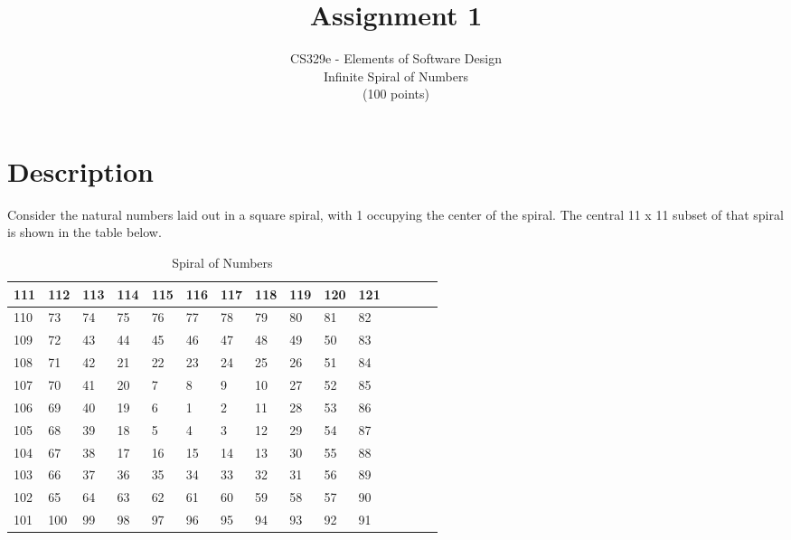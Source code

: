 \documentclass[12pt]{article}
\begin{document}
\title{Assignment 1}%
\author{CS329e - Elements of Software Design \\ %
Infinite Spiral of Numbers \\
(100 points)\\
} %

\date{\vspace{-5ex}}

\maketitle

\begin{center}



\end{center}


\section{Description}
Consider the natural numbers laid out in a square spiral, with 1 occupying the center of the spiral.
The central 11 x 11 subset of that spiral is shown in the table below.


\begin{table}[!h]

    \begin{center}
    \begin{tabular}{|l |l |l |l |l |l |l |l |l |l |l |l |l |l | l|} \hline
    111	& 112	& 113	& 114	& 115	& 116	& 117	& 118	& 119 & 120 & 121 \\ \hline 
    110 & 73 & 74 & 75 & 76 & 77 & 78 & 79 & 80 & 81 & 82 \\ \hline 
    109 & 72 & 43 & 44 & 45 & 46 & 47 & 48 & 49 & 50 & 83 \\ \hline 
    108 & 71 & 42 & 21 & 22 & 23 & 24 & 25 & 26 & 51 & 84 \\ \hline 
    107 & 70 & 41 & 20 & 7 & 8 & 9 & 10 & 27 & 52 & 85 \\ \hline 
    106 & 69 & 40 & 19 & 6 & 1 & 2 & 11 & 28 & 53 & 86 \\ \hline 
    105 & 68 & 39 & 18 & 5 & 4 & 3 & 12 & 29 & 54 & 87 \\ \hline 
    104 & 67 & 38 & 17 & 16 & 15 & 14 & 13 & 30 & 55 & 88 \\ \hline 
    103 & 66 & 37 & 36 & 35 & 34 & 33 & 32 & 31 & 56 & 89 \\ \hline 
    102 & 65 & 64 & 63 & 62 & 61 & 60 & 59 & 58 & 57 & 90  \\ \hline 
    101 & 100 & 99 & 98 & 97 & 96 & 95 & 94 & 93 & 92 & 91  \\ \hline 
    \end{tabular} 
    \caption{Spiral of Numbers}
    \label{tab:my_label}
    \end{center}

\end{table}
\end{document}
